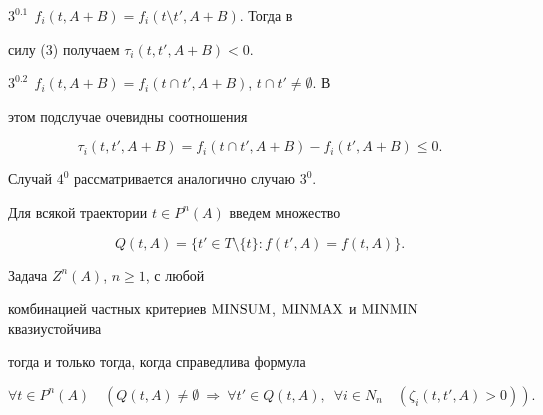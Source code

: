 \begin{pf}
$3^0.1\ \ f_i(t,A+B) = f_i(t\setminus t',A+B)$. Тогда в


силу (3) получаем $\tau_{i}(t,t',A+B) < 0$.





$3^0.2\ \ f_i(t,A+B)=f_i(t\cap t',A+B)$, $t\cap t'\ne \emptyset$. В


этом подслучае очевидны соотношения


$$


\tau_i(t,t',A+B)=f_i(t\cap t',A+B)-f_i(t',A+B)\le 0.


$$





Случай $4^0$ рассматривается аналогично случаю $3^0$.


\end{pf}





Для всякой траектории $t\in P^n(A)$ введем множество


$$


Q (t,A) =\{t'\in T\setminus\{t\}: f(t',A)=f(t,A)\}.


$$





\begin{thm}


Задача $Z^n(A)$, $n\ge 1$, с любой


комбинацией частных критериев $\operatorname{MINSUM}$, $\operatorname{MINMAX}$ и $\operatorname{MINMIN}$ квазиустойчива


тогда и только тогда, когда справедлива формула


$$


\forall t \in P^n(A)\quad (Q(t,A)\ne \emptyset \ \Rightarrow


\ \forall t' \in Q(t,A),\ \; \forall i \in N_n \quad (\zeta_i(t,t',A)>0)).


$$


\end{thm}





